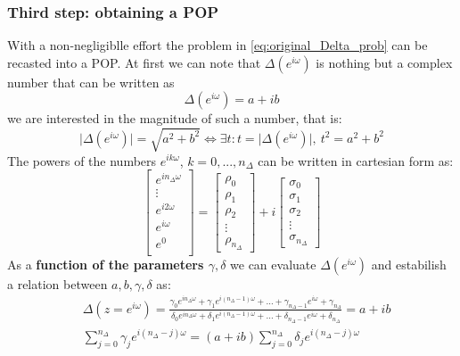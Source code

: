 \subsubsection{Third step: obtaining a POP}
With a non-negligiblle effort the problem in \cref{eq:original_Delta_prob} can be recasted into a POP. At first we can note that $\Delta(e^{i\omega})$ is nothing but a complex number that can be written as
\begin{equation}\label{eq:complex}
    \Delta(e^{i\omega})=a+ib
\end{equation}
we are interested in the magnitude of such a number, that is: 
\begin{equation}\label{eq:norm}
    \vert \Delta(e^{i\omega}) \vert = \sqrt{a^2+b^2} \iff \exists{t}: t=\vert \Delta(e^{i\omega}) \vert, \ t^2=a^2+b^2
\end{equation}
The powers of the numbers $e^{ik\omega}$, $k=0,...,n_\Delta$ can be written in cartesian form as: 
\begin{equation}
    \begin{bmatrix}
        e^{in_\Delta{\omega}}\\
        \vdots\\
        e^{i2\omega}\\
        e^{i\omega}\\
        e^0\\
    \end{bmatrix}=\begin{bmatrix}
        \rho_0\\\rho_1\\\rho_2\\\vdots\\\rho_{n_\Delta}
    \end{bmatrix}+ i \begin{bmatrix}
        \sigma_0\\\sigma_1\\\sigma_2\\\vdots\\\sigma_{n_\Delta}
    \end{bmatrix}
\end{equation}
As a \textbf{function of the parameters $\gamma,\delta$} we can evaluate $\Delta(e^{i\omega})$ and estabilish a relation between $a,b,\gamma,\delta$ as:
\begin{align}
    &\Delta(z=e^{i\omega})=\frac{
        \gamma_0{e^{i{n_\Delta}\omega}}+\gamma_1 e^{i(n_\Delta-1)\omega}+\dots+\gamma_{n_\Delta-1} e^{i\omega}+\gamma_{n_\Delta}
    }{
        \delta_0 {e^{i{n_\Delta}\omega}}+
        \delta_1 e^{i(n_\Delta-1)\omega}+
        \dots + 
        \delta_{n_\Delta-1}e^{i\omega}+
        \delta_{n_\Delta}
    }=a+ib\\
    &\sum_{j=0}^{n_\Delta} \gamma_j e^{i(n_\Delta-j)\omega} = (a+ib)
    \sum_{j=0}^{n_\Delta} \delta_j e^{i(n_\Delta-j)\omega}\label{eq:dgab}
\end{align}
